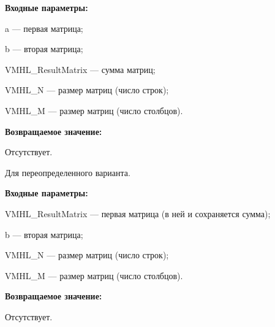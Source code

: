 \textbf{Входные параметры:}

 a --- первая матрица;
 
 b --- вторая матрица;
 
 VMHL\_ResultMatrix --- сумма матриц;
 
 VMHL\_N --- размер матриц (число строк);
 
 VMHL\_M --- размер матриц (число столбцов).

\textbf{Возвращаемое значение:}

Отсутствует.

Для переопределенного варианта.

\textbf{Входные параметры:}

 VMHL\_ResultMatrix --- первая матрица (в ней и сохраняется сумма);
 
 b --- вторая матрица;
 
 VMHL\_N --- размер матриц (число строк);
 
 VMHL\_M --- размер матриц (число столбцов).
 
 \textbf{Возвращаемое значение:}

Отсутствует.